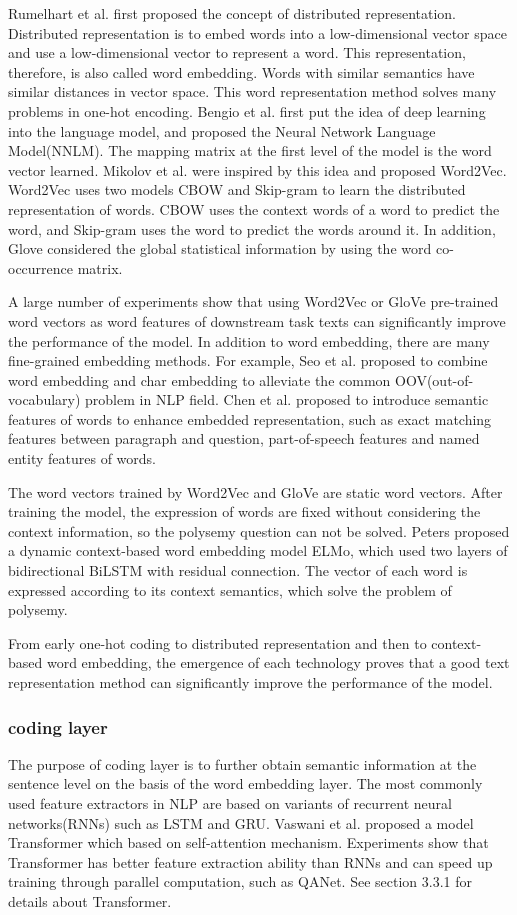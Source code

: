 Rumelhart et al. first proposed the concept of distributed representation. Distributed representation is to embed words into a 
low-dimensional vector space and use a low-dimensional vector to represent a word. This representation, therefore, is also called word embedding. 
Words with similar semantics have similar distances in vector space. This word representation method solves many problems in one-hot encoding. 
Bengio et al. first put the idea of deep learning into the language model, and proposed the Neural Network Language Model(NNLM). The mapping matrix 
at the first level of the model is the word vector learned. Mikolov et al. were inspired by this idea and proposed Word2Vec. 
Word2Vec uses two models CBOW and Skip-gram to learn the distributed representation of words. CBOW uses the context words of a word to predict the word, and 
Skip-gram uses the word to predict the words around it. In addition, Glove considered the global statistical information by using the 
word co-occurrence matrix.

A large number of experiments show that using Word2Vec or GloVe pre-trained word vectors as word features of downstream task texts can 
significantly improve the performance of the model. In addition to word embedding, there are many fine-grained embedding methods. For example, 
Seo et al. proposed to combine word embedding and char embedding to alleviate the common OOV(out-of-vocabulary) problem in NLP field. Chen et al. proposed to 
introduce semantic features of words to enhance embedded representation, such as exact matching features between paragraph and question, part-of-speech features and 
named entity features of words.

The word vectors trained by Word2Vec and GloVe are static word vectors. After training the model, the expression of words are fixed without 
considering the context information, so the polysemy question can not be solved. Peters proposed a dynamic context-based word embedding model ELMo, which 
used two layers of bidirectional BiLSTM with residual connection. The vector of each word is expressed according to its context semantics, which solve the problem of polysemy.

From early one-hot coding to distributed representation and then to context-based word embedding, the emergence of each technology proves that 
a good text representation method can significantly improve the performance of the model.


\subsubsection{coding layer}
The purpose of coding layer is to further obtain semantic information at the sentence level on the basis of the word embedding layer. 
The most commonly used feature extractors in NLP are based on variants of recurrent neural networks(RNNs) such as LSTM and GRU. Vaswani et al. proposed 
a model Transformer which based on self-attention mechanism. Experiments show that Transformer has better feature extraction ability than RNNs and can 
speed up training through parallel computation, such as QANet. See section 3.3.1 for details about Transformer.

